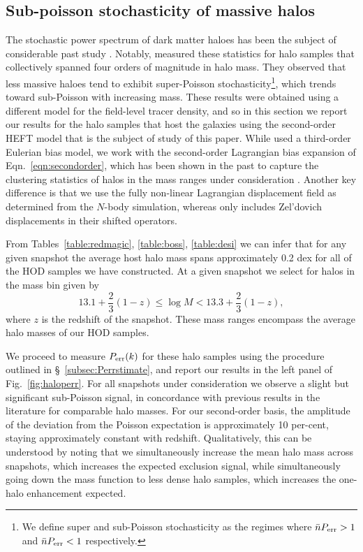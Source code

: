 \documentclass[fleqn,usenatbib]{mnras}
\begin{document}
\subsection{Sub-poisson stochasticity of massive halos}
\label{subsec:haloperr}
The stochastic power spectrum of dark matter haloes has been the subject of considerable past study \citep{Hamaus_2010,Baldauf_2013}. Notably, \cite{Schmittfull_2019} measured these statistics for halo samples that collectively spanned four orders of magnitude in halo mass. They observed that less massive haloes tend to
exhibit super-Poisson stochasticity\footnote{We define super and sub-Poisson stochasticity as the regimes where $\bar{n}P_{\rm err} > 1$ and $\bar{n}P_{\rm err} < 1$ respectively.}, which trends toward sub-Poisson with increasing mass. These results were obtained using a different model for the field-level tracer density, and so in this section we report our results for the halo samples that host the galaxies using the second-order HEFT model that is the subject of study of this paper. While \citet{Schmittfull_2019} used a third-order Eulerian bias model, we work with the second-order Lagrangian bias expansion of Eqn.~\ref{eqn:secondorder}, which has been shown in the past to capture the clustering statistics of halos in the mass ranges under consideration \citep{Abidi:2018eyd}. Another key difference is that we use the fully non-linear Lagrangian displacement field as determined from the $N$-body simulation, whereas \cite{Schmittfull_2019} only includes Zel'dovich displacements in their shifted operators. \par
From Tables~\ref{table:redmagic}, \ref{table:boss}, \ref{table:desi} we can infer that for any given snapshot the average host halo mass spans approximately 0.2 dex for all of the HOD samples we have constructed. At a given snapshot we select for halos in the mass bin given by 
\begin{equation}
\label{eqn:mbins}
13.1 + \frac{2}{3}(1-z) \leq \log M < 13.3 + \frac{2}{3}(1-z),
\end{equation}
where $z$ is the redshift of the snapshot. These mass ranges encompass the average halo masses of our HOD samples. \par 
We proceed to measure $P_{\rm err}(k)$ for these halo samples using the procedure outlined in \S~\ref{subsec:Perrstimate}, and report our results in the left panel of Fig.~\ref{fig:haloperr}. For all snapshots under consideration we observe a slight but significant sub-Poisson signal, in concordance with previous results in the literature for comparable halo masses. For our second-order basis, the amplitude of the deviation from the Poisson expectation is approximately 10 per-cent, staying approximately constant with redshift. Qualitatively, this can be understood by noting that we simultaneously increase the mean halo mass across snapshots, which increases the expected exclusion signal, while simultaneously going down the mass function to less dense halo samples, which increases the one-halo enhancement expected. \par 
\end{document}
